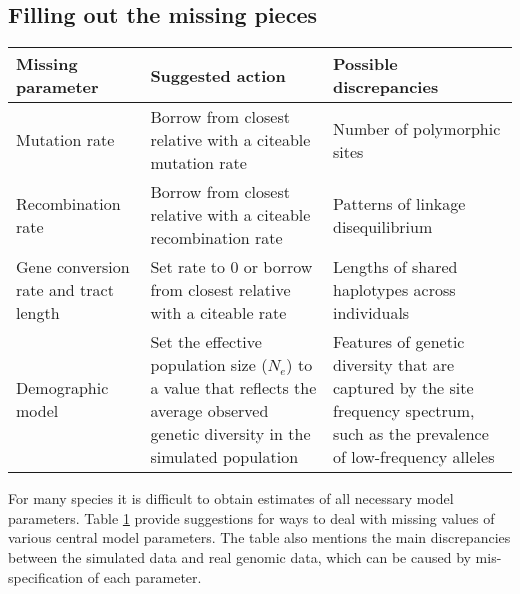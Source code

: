 \documentclass[hidelinks]{article}
\begin{document}
\subsection*{Filling out the missing pieces}

\begin{table}[b!]
	 \label{tab:param-mod}
	\begin{tabular}{p{1.5in}p{2.2in}p{2.2in}}
		\hline
		\textbf{Missing parameter}  & 
		\textbf{Suggested action} & 
		\textbf{Possible discrepancies} \\
		\hline
		Mutation rate      &
		Borrow from closest relative with a citeable mutation rate &
		Number of polymorphic sites  \\
		\hline
		Recombination rate &
		Borrow from closest relative with a citeable recombination rate &
		Patterns of linkage disequilibrium
		\\
		\hline
		Gene conversion rate and tract length &
		Set rate to 0 or borrow from closest relative with a citeable rate &
		Lengths of shared haplotypes across individuals
		\\
		\hline
		Demographic model &
		Set the effective population size ($N_e$) to a value
		that reflects the average observed genetic diversity in the
		simulated population
		     &
		Features of genetic diversity that are captured by the site frequency spectrum,
		such as the prevalence of low-frequency alleles\\
		\hline
	\end{tabular}
\end{table}

For many species it is difficult to obtain estimates of all necessary model parameters.
Table \ref{tab:param-mod} provide suggestions for ways to deal with missing values of various central model parameters.
The table also mentions the main discrepancies between the simulated data and real genomic data,
which can be caused by mis-specification of each parameter.
\end{document}
